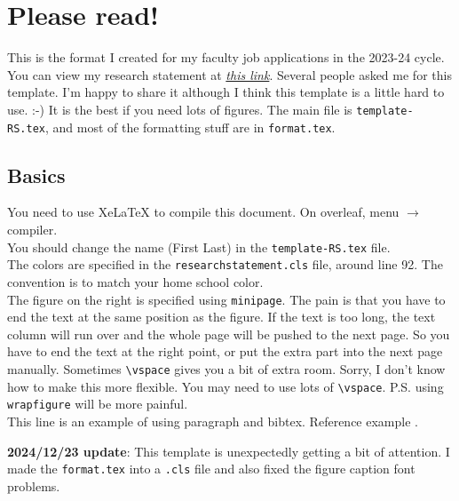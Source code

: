 


\setlength{\columnsep}{15pt}%
\setlength{\intextsep}{0pt plus 0pt minus 0pt}

\begin{minipage}[t]{504pt}
\begin{minipage}[t]{350pt}
\setlength{\parindent}{\myindent}
\setlength{\parskip}{\myparskip}

 \vspace*{-10pt}

\section{Please read!}

This is the format I created for my faculty job applications in the 2023-24 cycle.  You can view my research statement at \href{https://www.fmyang.com/files/statements/Fumeng_Yang-RS_2023.pdf}{\textit{this link}}. Several people asked me for this template. 
I'm happy to share it although I think this template is a little hard to use. :-) It is the best if you need lots of figures.
The main file is \verb|template-RS.tex|, and most of the formatting stuff are in \verb|format.tex|.  

\subsection{Basics}
You need to use XeLaTeX to compile this document. On overleaf, menu $\rightarrow$ compiler. \\
You should change the name (First Last) in the \verb|template-RS.tex| file. \\
The colors are specified in the \verb|researchstatement.cls| file, around line 92. The convention is to match your home school color. \\
The figure on the right is specified using  \verb|minipage|. The pain is that you have to end the text at the same position as the figure. If the text is too long, the text column will run over and the whole page will be pushed to the next page. So you have to end the text at the right point, or put the extra part into the next page manually. Sometimes \verb|\vspace| gives you a bit of extra room. Sorry, I don't know how to make this more flexible. You may need to use lots of \verb|\vspace|. P.S. using \verb|wrapfigure| will be more painful. \\
This line is an example of using paragraph and bibtex. Reference example \cite{examplepaper}.

\textbf{2024/12/23 update}: This template is unexpectedly getting a bit of attention. I made the \verb|format.tex| into a \verb|.cls| file and also fixed the figure caption font problems. 


\end{minipage}
\end{minipage}
